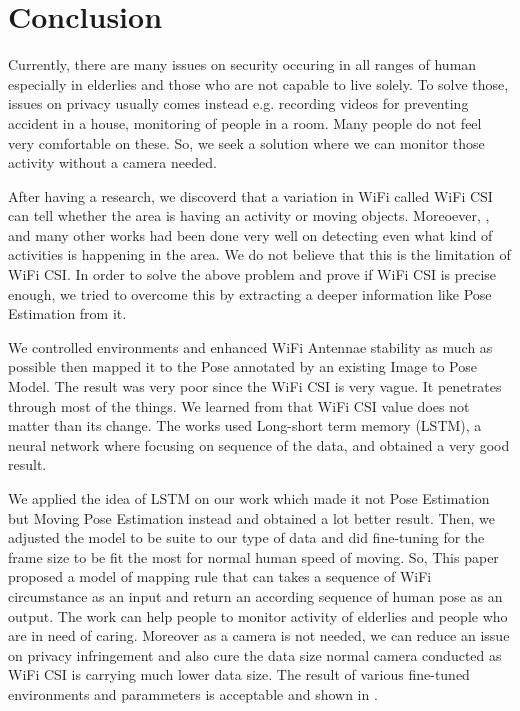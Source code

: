 \documentclass[10pt,letterpaper]{article}
\begin{document}
 	\section*{Conclusion}

	Currently, there are many issues on security occuring in all ranges of human especially in elderlies and those who are not capable to live solely. To solve those, issues on privacy usually comes instead e.g. recording videos for preventing accident in a house, monitoring of people in a room. Many people do not feel very comfortable on these. So, we seek a solution where we can monitor those activity without a camera needed. 
	
	After having a research, we discoverd that a variation in WiFi called WiFi CSI can tell whether the area is having an activity or moving objects. Moreoever, \cite{chowdhuryTZ}, \cite{zouH} and many other works had been done very well on detecting even what kind of activities is happening in the area. We do not believe that this is the limitation of WiFi CSI. In order to solve the above problem and prove if WiFi CSI is precise enough, we tried to overcome this by extracting a deeper information like Pose Estimation from it. 
	
	We controlled environments and enhanced WiFi Antennae stability as much as possible then mapped it to the Pose annotated by an existing Image to Pose Model. The result was very poor since the WiFi CSI is very vague. It penetrates through most of the things. We learned from \cite{bib20} that WiFi CSI value does not matter than its change. The works used Long-short term memory (LSTM), a neural network where focusing on sequence of the data, and obtained a very good result. 
	
	
	We applied the idea of LSTM on our work which made it not Pose Estimation but Moving Pose Estimation instead and obtained a lot better result. Then, we adjusted the model to be suite to our type of data and did fine-tuning for the frame size to be fit the most for normal human speed of moving. So, This paper proposed a model of mapping rule that can takes a sequence of WiFi circumstance as an input and return an according sequence of human pose as an output. The work can help people to monitor activity of elderlies and people who are in need of caring. Moreover as a camera is not needed, we can reduce an issue on privacy infringement and also cure the data size normal camera conducted as WiFi CSI is carrying much lower data size.
	The result of various fine-tuned environments and parammeters is acceptable and shown in .
	
\end{document}
